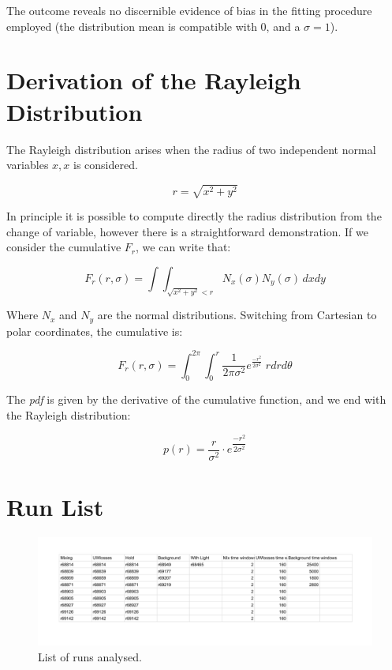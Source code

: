 \documentclass[11pt,a4paper,oneside]{article}
\begin{document}
The outcome reveals no discernible evidence of bias in the fitting procedure employed (the distribution mean is compatible with $0$, and a $\sigma = 1$).

\appendix
\section{Derivation of the Rayleigh Distribution}
\label{sec:Rayleigh}

The Rayleigh distribution arises when the radius of two independent normal variables $x,x$ is considered.

\begin{equation*}
r = \sqrt{x^{2} + y^{2}}
\end{equation*} 


In principle it is possible to compute directly the radius distribution from the change of variable, however there is a straightforward demonstration. If we consider the cumulative $F_{r}$, we can write that:

\begin{equation*}
F_{r}(r, \sigma) = \int \int_{ \sqrt{x^{2} + y^{2}} < r} N_{x}(\sigma) N_{y}(\sigma) \, dx dy
\end{equation*}

Where $N_{x}$ and $N_{y}$ are the normal distributions. Switching from Cartesian to polar coordinates, the cumulative is:

\begin{equation*}
F_{r}(r, \sigma) =  \int_{0}^{2 \pi} \int_{0}^{r} \frac{1}{2 \pi \sigma^{2}}  e^{ \frac{- r^{2}}{2 \sigma^{2}}} \; r  dr d\theta
\end{equation*}


The \textit{pdf} is given by the derivative of the cumulative function, and we end with the Rayleigh distribution:


\begin{equation}
p(r) = \frac{r}{\sigma^{2}} \cdot  e^{ \dfrac{- r^{2}}{ 2 \sigma^{2}}}
\end{equation}


\section{Run List}
\label{fig:RunList}

\begin{figure}[hbtp]
\centering
\includegraphics[width = 1\textwidth]{../ALPHA-2/PlotMLEfit/ListofRun-cropped.pdf}
\caption{List of runs analysed.}
\end{figure}
\end{document}
